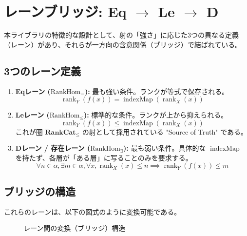 \documentclass[a4paper,11pt]{article}
\theoremstyle{definition}
\theoremstyle{plain}
\newcommand{\code}[1]{\texttt{#1}}
\newcommand{\rank}{\operatorname{rank}}
\newcommand{\layer}{\operatorname{layer}}
\newcommand{\indexMap}{\operatorname{indexMap}}
\newcommand{\RankCatLe}{\mathbf{RankCat}_{\le}}
\newcommand{\RankHomLe}{\mathrm{RankHom}_{\le}}
\newcommand{\RankHomEq}{\mathrm{RankHom}_{=}}
\newcommand{\RankHomD}{\mathrm{RankHom}_{\exists}}
\begin{document}
\section{レーンブリッジ: Eq $\to$ Le $\to$ D}

本ライブラリの特徴的な設計として、射の「強さ」に応じた3つの異なる定義（レーン）があり、それらが一方向の含意関係（ブリッジ）で結ばれている。

\subsection{3つのレーン定義}

\begin{enumerate}
    \item \textbf{Eqレーン ($\RankHomEq$):} 最も強い条件。ランクが等式で保存される。
    \[ \rank_Y(f(x)) = \indexMap(\rank_X(x)) \]
    
    \item \textbf{Leレーン ($\RankHomLe$):} 標準的な条件。ランクが上から抑えられる。
    \[ \rank_Y(f(x)) \le \indexMap(\rank_X(x)) \]
    これが圏 $\RankCatLe$ の射として採用されている "Source of Truth" である。

    \item \textbf{Dレーン / 存在レーン ($\RankHomD$):} 最も弱い条件。具体的な $\indexMap$ を持たず、各層が「ある層」に写ることのみを要求する。
    \[ \forall n \in \alpha, \exists m \in \alpha, \forall x, \rank_X(x) \le n \implies \rank_Y(f(x)) \le m \]
\end{enumerate}

\subsection{ブリッジの構造}

これらのレーンは、以下の図式のように変換可能である。

\begin{figure}[h]
\centering
{}
\caption{レーン間の変換（ブリッジ）構造}
\end{figure}
\end{document}
